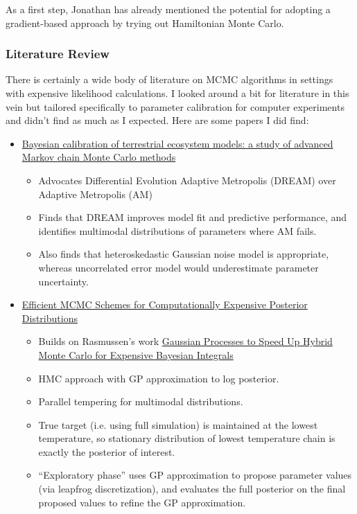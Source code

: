 \documentclass[12pt]{article}
\begin{document}
As a first step, Jonathan has already mentioned the potential for adopting a gradient-based approach by trying out Hamiltonian Monte Carlo. 


\subsubsection{Literature Review}
There is certainly a wide body of literature on MCMC algorithms in settings with expensive likelihood calculations. I looked around a bit for literature in this vein but 
tailored specifically to parameter calibration for computer experiments and didn't find as much as I expected. Here are some papers I did find: 
\begin{itemize}
\item \href{https://bg.copernicus.org/articles/14/4295/2017/}{Bayesian calibration of terrestrial ecosystem models: a study of advanced Markov chain Monte Carlo methods}
	\begin{itemize}
	\item Advocates Differential Evolution Adaptive Metropolis (DREAM) over Adaptive Metropolis (AM)
	\item Finds that DREAM improves model fit and predictive performance, and identifies multimodal distributions of parameters where AM fails. 
	\item Also finds that heteroskedastic Gaussian noise model is appropriate, whereas uncorrelated error model would underestimate parameter uncertainty. 
	\end{itemize}
\item \href{https://www.tandfonline.com/doi/abs/10.1198/TECH.2010.09195}{Efficient MCMC Schemes for Computationally Expensive Posterior Distributions}
	\begin{itemize}
	\item Builds on Rasmussen's work \href{http://mlg.eng.cam.ac.uk/pub/pdf/Ras03.pdf}{Gaussian Processes to Speed Up Hybrid Monte Carlo for Expensive Bayesian Integrals}
	\item HMC approach with GP approximation to log posterior.
	\item Parallel tempering for multimodal distributions.
	\item True target (i.e. using full simulation) is maintained at the lowest temperature, so stationary distribution of lowest temperature chain is exactly the posterior of interest. 
	\item ``Exploratory phase'' uses GP approximation to propose parameter values (via leapfrog discretization), and evaluates the full posterior on the final proposed values to refine the GP approximation.

\end{itemize}
\end{itemize}
\end{document}
